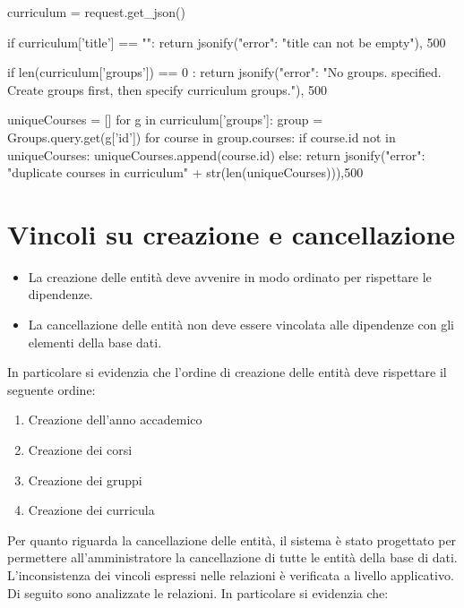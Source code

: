 \documentclass{article}
\begin{document}
\begin{python}
curriculum	= request.get_json()
		
		if curriculum['title'] == "":
			return jsonify({"error": "title can not be empty"}), 500

		if len(curriculum['groups']) == 0 :
			return jsonify({"error": "No groups. specified. Create groups first, then specify curriculum groups."}), 500


		uniqueCourses = []
		for g in curriculum['groups']:
			group = Groups.query.get(g['id'])
			for course in group.courses:
				if course.id not in uniqueCourses:
					uniqueCourses.append(course.id)
				else:
					return jsonify({"error": "duplicate courses in curriculum" + str(len(uniqueCourses))}),500
\end{python}



\section{Vincoli su creazione e cancellazione}


\begin{itemize}
\item La creazione delle entità deve avvenire in modo ordinato per rispettare le dipendenze.
\item La cancellazione delle entità non deve essere vincolata alle dipendenze con gli elementi della base dati.
\end{itemize}

In particolare si evidenzia che l'ordine di creazione delle entità deve rispettare il seguente ordine:
\begin{enumerate}
\item Creazione dell'anno accademico
\item Creazione dei corsi
\item Creazione dei gruppi
\item Creazione dei curricula
\end{enumerate}

Per quanto riguarda la cancellazione delle entità, il sistema è stato progettato per permettere all'amministratore la cancellazione di tutte le entità della base di dati. L'inconsistenza dei vincoli espressi nelle relazioni è verificata a livello applicativo. Di seguito sono analizzate le relazioni.
In particolare si evidenzia che:
\end{document}
